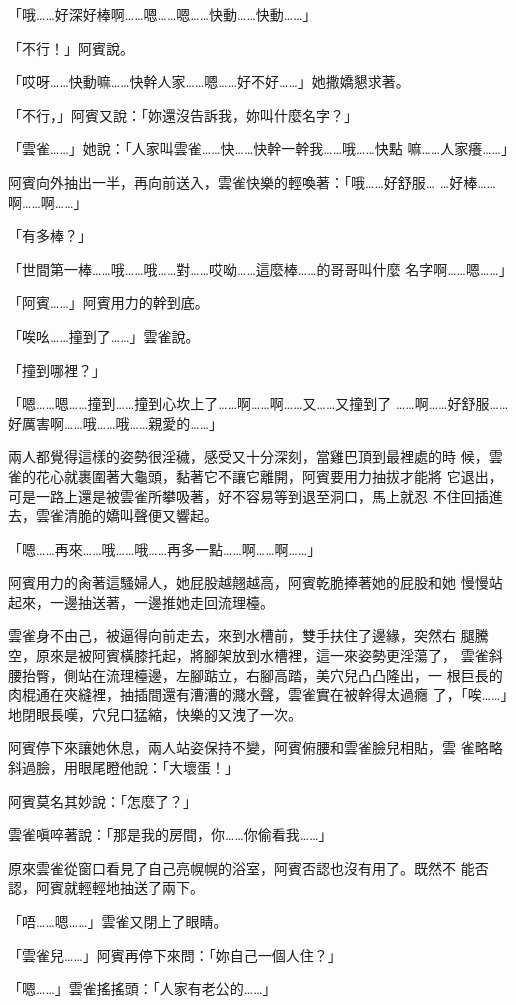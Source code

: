 「哦……好深好棒啊……嗯……嗯……快動……快動……」

「不行！」阿賓說。

「哎呀……快動嘛……快幹人家……嗯……好不好……」她撒嬌懇求著。

「不行，」阿賓又說：「妳還沒告訴我，妳叫什麼名字？」

「雲雀……」她說：「人家叫雲雀……快……快幹一幹我……哦……快點
嘛……人家癢……」

阿賓向外抽出一半，再向前送入，雲雀快樂的輕喚著：「哦……好舒服…
…好棒……啊……啊……」

「有多棒？」

「世間第一棒……哦……哦……對……哎呦……這麼棒……的哥哥叫什麼
名字啊……嗯……」

「阿賓……」阿賓用力的幹到底。

「唉吆……撞到了……」雲雀說。

「撞到哪裡？」

「嗯……嗯……撞到……撞到心坎上了……啊……啊……又……又撞到了
……啊……好舒服……好厲害啊……哦……哦……親愛的……」

兩人都覺得這樣的姿勢很淫穢，感受又十分深刻，當雞巴頂到最裡處的時
候，雲雀的花心就裹圍著大龜頭，黏著它不讓它離開，阿賓要用力抽拔才能將
它退出，可是一路上還是被雲雀所攀吸著，好不容易等到退至洞口，馬上就忍
不住回插進去，雲雀清脆的嬌叫聲便又響起。

「嗯……再來……哦……哦……再多一點……啊……啊……」

阿賓用力的肏著這騷婦人，她屁股越翹越高，阿賓乾脆捧著她的屁股和她
慢慢站起來，一邊抽送著，一邊推她走回流理檯。

雲雀身不由己，被逼得向前走去，來到水槽前，雙手扶住了邊緣，突然右
腿騰空，原來是被阿賓橫膝托起，將腳架放到水槽裡，這一來姿勢更淫蕩了，
雲雀斜腰抬臀，側站在流理檯邊，左腳踮立，右腳高踏，美穴兒凸凸隆出，一
根巨長的肉棍通在夾縫裡，抽插間還有漕漕的濺水聲，雲雀實在被幹得太過癮
了，「唉……」地閉眼長嘆，穴兒口猛縮，快樂的又洩了一次。

阿賓停下來讓她休息，兩人站姿保持不變，阿賓俯腰和雲雀臉兒相貼，雲
雀略略斜過臉，用眼尾瞪他說：「大壞蛋！」

阿賓莫名其妙說：「怎麼了？」

雲雀嗔啐著說：「那是我的房間，你……你偷看我……」

原來雲雀從窗口看見了自己亮幌幌的浴室，阿賓否認也沒有用了。既然不
能否認，阿賓就輕輕地抽送了兩下。

「唔……嗯……」雲雀又閉上了眼睛。

「雲雀兒……」阿賓再停下來問：「妳自己一個人住？」

「嗯……」雲雀搖搖頭：「人家有老公的……」

